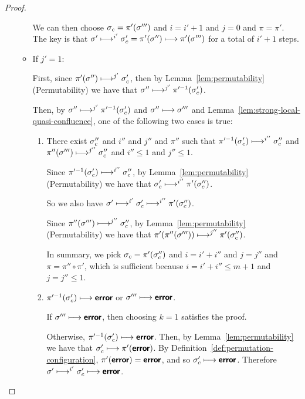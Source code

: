 \begin{proof}
\begin{enumerate}
\begin{itemize}
        We can then choose $\sigma_c = \pi'(\sigma''')$ and $i = i' + 1$
        and $j = 0$ and $\pi = \pi'$.  The key is that $\sigma'
        \longmapsto^{i'} \sigma'_c = \pi'(\sigma'') \longmapsto
        \pi'(\sigma''')$ for a total of $i' + 1$ steps.
        
      \item If $j' = 1$:

        First, since $\pi'(\sigma'') \longmapsto^{j'} \sigma'_c$, then
        by Lemma~\ref{lem:permutability} (Permutability) we have that
        $\sigma'' \longmapsto^{j'} \pi'^{-1}(\sigma'_c)$.
        
        Then, by $\sigma'' \longmapsto^{j'} \pi'^{-1}(\sigma'_c)$ and
        $\sigma'' \longmapsto \sigma'''$ and
        Lemma~\ref{lem:strong-local-quasi-confluence}, one of the
        following two cases is true:
        \begin{enumerate}
        \item There exist $\sigma_c''$ and $i''$ and $j''$ and $\pi''$
          such that $\pi'^{-1}(\sigma'_c) \longmapsto^{i''}
          \sigma_c''$ and $\pi''(\sigma''') \longmapsto^{j''} \sigma_c''$
          and $i'' \leq 1$ and $j'' \leq 1$.

          Since $\pi'^{-1}(\sigma'_c) \longmapsto^{i''} \sigma_c''$,
          by Lemma~\ref{lem:permutability} (Permutability) we have
          that $\sigma'_c \longmapsto^{i''} \pi'(\sigma_c'')$.

          So we also have $\sigma' \longmapsto^{i'} \sigma_c'
          \longmapsto^{i''} \pi'(\sigma_c'')$.

          Since $\pi''(\sigma''') \longmapsto^{j''} \sigma_c''$, by
          Lemma~\ref{lem:permutability} (Permutability) we have that
          $\pi'(\pi''(\sigma''')) \longmapsto^{j''} \pi'(\sigma_c'')$.

          In summary, we pick $\sigma_c = \pi'(\sigma_c'')$ and $i = i' + i''$
          and $j = j''$ and $\pi = \pi'' \circ \pi'$, which is sufficient
          because $i = i' + i'' \leq m + 1$ and $j = j'' \leq 1$.

        \item $\pi'^{-1}(\sigma'_c) \longmapsto \textbf{\textsf{error}}$ or $\sigma'''
          \longmapsto \textbf{\textsf{error}}$.

          If $\sigma''' \longmapsto \textbf{\textsf{error}}$, then choosing $k = 1$
          satisfies the proof.

          Otherwise, $\pi'^{-1}(\sigma'_c) \longmapsto \textbf{\textsf{error}}$.
          Then, by Lemma~\ref{lem:permutability} we have that
          $\sigma'_c \longmapsto \pi'(\textbf{\textsf{error}})$.  By
          Definition~\ref{def:permutation-configuration},
          $\pi'(\textbf{\textsf{error}}) = \textbf{\textsf{error}}$, and so $\sigma'_c \longmapsto
          \textbf{\textsf{error}}$. Therefore $\sigma' \longmapsto^{i'} \sigma'_c
          \longmapsto \textbf{\textsf{error}}$.


\end{enumerate}
\end{itemize}
\end{enumerate}
\end{proof}
